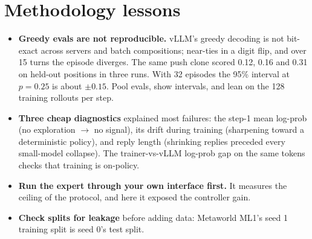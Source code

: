 \documentclass[11pt]{article}
\begin{document}
\section{Methodology lessons}
\label{sec:noise}
\begin{itemize}
\item \textbf{Greedy evals are not reproducible.} vLLM's greedy decoding is not bit-exact across servers and batch
  compositions; near-ties in a digit flip, and over 15 turns the episode diverges. The same push clone scored 0.12, 0.16
  and 0.31 on held-out positions in three runs. With 32 episodes the 95\% interval at $p=0.25$ is about $\pm0.15$. Pool
  evals, show intervals, and lean on the 128 training rollouts per step.
\item \textbf{Three cheap diagnostics} explained most failures: the step-1 mean log-prob (no exploration $\to$ no signal),
  its drift during training (sharpening toward a deterministic policy), and reply length (shrinking replies preceded every
  small-model collapse). The trainer-vs-vLLM log-prob gap on the same tokens checks that training is on-policy.
\item \textbf{Run the expert through your own interface first.} It measures the ceiling of the protocol, and here it
  exposed the controller gain.
\item \textbf{Check splits for leakage} before adding data: Metaworld ML1's seed 1 training split is seed 0's test split.
\end{itemize}

\end{document}
